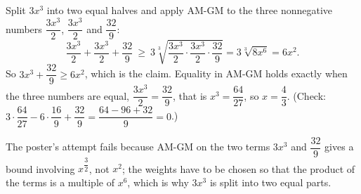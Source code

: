 Split $3x^3$ into two equal halves and apply AM-GM to the three nonnegative numbers $\dfrac{3x^3}{2}$, $\dfrac{3x^3}{2}$ and $\dfrac{32}{9}$:
\[
\dfrac{3x^3}{2}+\dfrac{3x^3}{2}+\dfrac{32}{9}\ \ge\ 3\sqrt[3]{\dfrac{3x^3}{2}\cdot\dfrac{3x^3}{2}\cdot\dfrac{32}{9}}
=3\sqrt[3]{8x^6}=6x^2 .
\]
So $3x^3+\dfrac{32}{9}\ge6x^2$, which is the claim. Equality in AM-GM holds exactly when the three numbers are equal, $\dfrac{3x^3}{2}=\dfrac{32}{9}$, that is $x^3=\dfrac{64}{27}$, so $\boxed{x=\dfrac{4}{3}}$. (Check: $3\cdot\dfrac{64}{27}-6\cdot\dfrac{16}{9}+\dfrac{32}{9}=\dfrac{64-96+32}{9}=0$.)

The poster's attempt fails because AM-GM on the two terms $3x^3$ and $\dfrac{32}{9}$ gives a bound involving $x^{\dfrac{3}{2}}$, not $x^2$; the weights have to be chosen so that the product of the terms is a multiple of $x^6$, which is why $3x^3$ is split into two equal parts.
